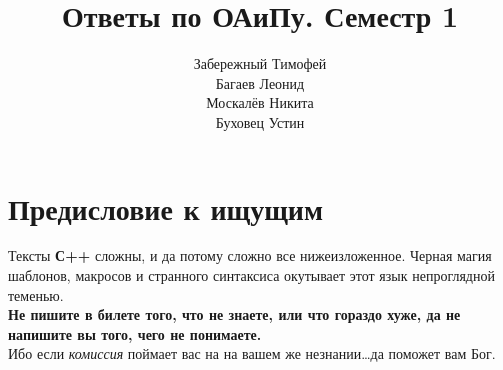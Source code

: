 \documentclass[12pt, a4paper]{extarticle}
\author{
  Забережный Тимофей \\
  Багаев     Леонид  \\
  Москалёв   Никита  \\
  Буховец    Устин   \\
}
\title{Ответы по ОАиПу. Семестр 1}
\begin{document}
\clearpage\maketitle
\thispagestyle{empty}

\newpage
\section*{Предисловие к ищущим}
\large{Тексты \textbf{С++} сложны, и да потому сложно все нижеизложенное.
Черная магия шаблонов, макросов и странного синтаксиса окутывает этот язык непроглядной теменью.}\\

\Large{\textbf{Не пишите в билете того, что не знаете, или что гораздо хуже, да не напишите вы того, чего не понимаете.}}\\

\large{Ибо если \textit{комиссия} поймает вас на на вашем же незнании\dots да поможет вам Бог.}
\normalsize
\newpage
\tableofcontents
\newpage





\setcounter{section}{36}



\end{document}
